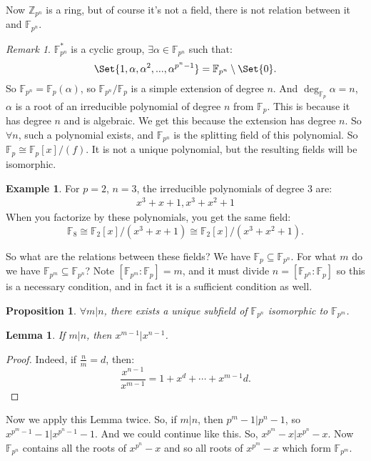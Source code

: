 \documentclass[9pt,reqno,twoside]{amsbook}
\theoremstyle{plain}
\numberwithin{section}{chapter}
\numberwithin{equation}{chapter}
\newtheorem{lem}[theorem]{Lemma}
\newtheorem{Prop}[theorem]{Proposition}
\theoremstyle{definition}
\newtheorem{Ex}[theorem]{Example}
\theoremstyle{remark}
\newtheorem{rem}[theorem]{Remark}
\theoremstyle{plain}
\newcommand{\sub}{\subseteq}
\newcommand{\z}{\mathbb{Z}}
\newcommand{\F}{\mathbb{F}}
\newcommand{\bee}{\begin{equation}\begin{aligned}}
\newcommand{\eee}{\end{aligned}\end{equation}}
\newcommand{\fracc}{\frac}
\begin{document}
Now $\z_{p^n}$ is a ring, but of course it's not a field, there is not relation between it and $\F_{p^n}$. 

\begin{rem}
$\F_{p^n}^*$ is a cyclic group, $\exists \alpha \in \F_{p^n}$ such that:
$$
\Set{1,\alpha, \alpha^2,...,\alpha^{p^n - 1}} = \F_{p^n}\setminus \Set{0}.
$$
So $\F_{p^n} = \F_p(\alpha)$, so $\F_{p^n}/\F_p$ is a simple extension of degree $n$.  And $\deg_{\F_p}\alpha = n$, $\alpha$ is a root of an irreducible polynomial of degree $n$ from $\F_p$. This is because it has degree $n$ and is algebraic. We get this because the extension has degree $n$. So $\forall n$, such a polynomial exists, and $\F_{p^n}$ is the splitting field of this polynomial. So $\F_p \cong \F_p [x]/(f)$. It is not a unique polynomial, but the resulting fields will be isomorphic. 
\end{rem}

\begin{Ex}
For $p = 2$, $n = 3$, the irreducible polynomials of degree 3 are:
\bee
x^3 + x + 1, x^3 + x^2 + 1
\eee
When you factorize by these polynomials, you get the same field:
$$
\F_8 \cong \F_2[x]/(x^3 + x + 1) \cong \F_2[x]/(x^3 + x^2 + 1).
$$
\end{Ex}

So what are the relations between these fields? We have $\F_p \sub \F_{p^n}$. For what $m$ do we have $\F_{p^m} \sub \F_{p^n}$? Note $[\F_{p^m}:\F_p] = m$, and it must divide $n = [\F_{p^n}:\F_p]$ so this is a necessary condition, and in fact it is a sufficient condition as well. 

\begin{Prop}
$\forall m|n$, there exists a unique subfield of $\F_{p^n}$ isomorphic to $\F_{p^m}$. 
\end{Prop}

\begin{lem}
If $m|n$, then $x^{m - 1}|x^{n - 1}$. 
\end{lem}

\begin{proof}
Indeed, if $\fracc{n}{m} = d$, then:
$$
\fracc{x^{n - 1}}{x^{m - 1}} = 1  + x^d + \cdots + x^{m - 1}d.
$$
\end{proof}

Now we apply this Lemma twice. So, if $m|n$, then $p^{m} - 1|p^n - 1$, so $x^{p^m - 1} - 1|x^{p^n - 1} - 1$. And we could continue like this. So, $x^{p^m} - x|x^{p^n} - x$. Now $\F_{p^n}$ contains all the roots of $x^{p^n} - x$ and so all roots of $x^{p^m} - x$ which form $\F_{p^m}$. 
\end{document}
